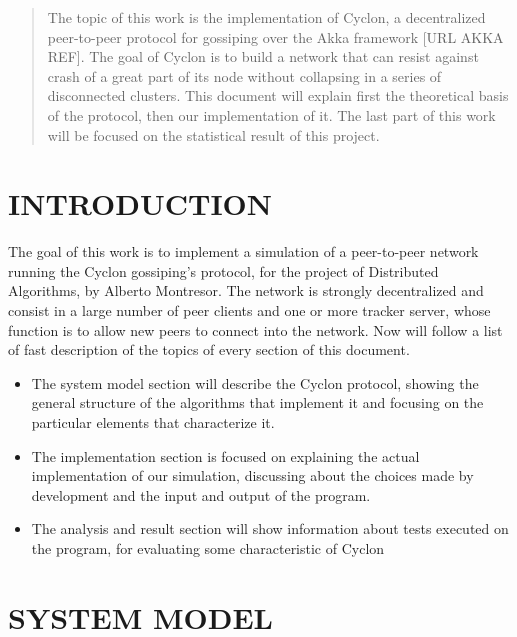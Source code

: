 \documentclass[a4paper,12pt,notitlepage]{article} %
\begin{document}

\begin{abstract}
   	 	
    The topic of this work is the implementation of Cyclon, a decentralized
    peer-to-peer protocol for gossiping over the Akka framework [URL AKKA REF].
    The goal of Cyclon is to build a network that can resist against crash of 
    a great part of its node without  collapsing in a series of disconnected clusters.
    This document will explain first the theoretical basis of the protocol, then 
    our implementation of it. The last part of this work will be focused on the statistical
    result of this project.
  

\end{abstract}
\newpage



\section{INTRODUCTION}

The goal of this work is to implement a simulation of a peer-to-peer network running
 the Cyclon gossiping's protocol, for the project of Distributed Algorithms, by Alberto Montresor. 
 The network is strongly decentralized and consist in a 
 large number of peer clients and one or more tracker server, whose function is to allow new 
 peers to connect into the network. Now will follow a list of fast description of the topics of every
 section of this document.

 \begin{itemize}
 	\item The system model section will describe the Cyclon protocol, showing  the general structure of 
 	the algorithms that implement it and focusing on the particular elements that characterize it.
 	\item The implementation section is focused on explaining the actual implementation of 
 	our simulation, discussing about the choices made by development and the input and
 	 output of the program.
 	\item The analysis and result section will show information about tests executed on 
 	the program, for evaluating some characteristic of Cyclon
 \end{itemize}



\section{SYSTEM MODEL}
\end{document}
